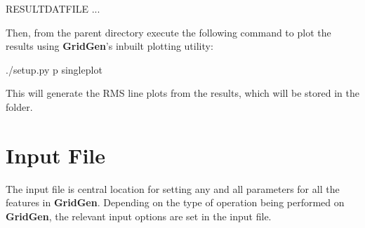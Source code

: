 \documentclass[letterpaper,10pt,english]{sphinxmanual}
\begin{document}
\begin{sphinxVerbatim}[commandchars=\\\{\}]
       RESULTDATFILE
       ...
\end{sphinxVerbatim}

Then, from the parent directory execute the following command to plot the results using {\color{red}\bfseries{}\textbar{}GridGen\textbar{}}’s inbuilt plotting utility:

\begin{sphinxVerbatim}[commandchars=\\\{\}]
\PYGZdl{} ./setup.py \PYGZhy{}p single\PYGZus{}plot
\end{sphinxVerbatim}

This will generate the RMS line plots from the results, which will be stored in the  folder.


\section{Input File}
\label{\detokenize{inputfile::doc}}\label{\detokenize{inputfile:input-file}}\label{\detokenize{inputfile:inputfile}}
The input file is central location for setting any and all parameters for all the features in {\color{red}\bfseries{}\textbar{}GridGen\textbar{}}. Depending on the type of operation being performed on {\color{red}\bfseries{}\textbar{}GridGen\textbar{}}, the relevant input options are set in the input file.
\end{document}
